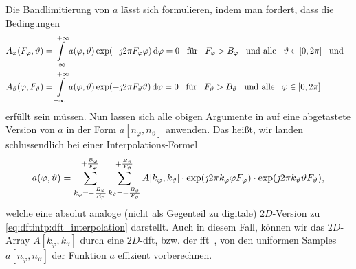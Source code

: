 Die Bandlimitierung von $a$ l\"asst sich formulieren, indem man fordert, dass die Bedingungen
\begin{align}
    A_{\varphi}(F_\varphi, \vartheta) 
    &= {\int\limits_{-\infty}^{+\infty}{
        a(\varphi, \vartheta) \exp(-\jmath 2 \pi F_\varphi \varphi)
    }\,\mathrm{d}{\varphi}} = 0 
    {\hspace{3mm} \text{f\"ur} \hspace{3mm}} F_\varphi > B_\varphi {\hspace{3mm} \text{und alle} \hspace{3mm}} \vartheta \in [0, 2 \pi] {\hspace{3mm} \text{und} \hspace{3mm}} \\
    A_{\vartheta}(\varphi, F_\vartheta) 
    &= {\int\limits_{-\infty}^{+\infty}{
        a(\varphi, \vartheta) \exp(-\jmath 2 \pi F_\vartheta \vartheta)
    }\,\mathrm{d}{\varphi}} = 0 
    {\hspace{3mm} \text{f\"ur} \hspace{3mm}} F_\vartheta > B_\vartheta {\hspace{3mm} \text{und alle} \hspace{3mm}} \varphi \in [0, 2 \pi]
\end{align}
erf\"ullt sein m\"ussen.
Nun lassen sich alle obigen Argumente in   auf eine abgetastete Version von $a$ in der Form $a[n_\varphi, n_\vartheta]$ anwenden. 
Das hei{\ss}t, wir landen schlussendlich bei einer Interpolations-Formel
\begin{equation}\label{2d_dft_interpolation}
    a(\varphi, \vartheta) = {\sum\limits_{k_\varphi=-\frac{B_\varphi}{F_\varphi}}^{+\frac{B_\varphi}{F_\varphi}}{
        {\sum\limits_{k_\vartheta=-\frac{B_\vartheta}{F_\vartheta}}^{+\frac{B_\vartheta}{F_\vartheta}}{
            A[k_\varphi, k_\vartheta] 
            \cdot \exp(\jmath 2 \pi k_\varphi \varphi F_\varphi)
            \cdot \exp(\jmath 2 \pi k_\vartheta \vartheta F_\vartheta)
        }}
    }},
\end{equation}
welche eine absolut analoge (nicht als Gegenteil zu digitale) $2D$-Version zu \eqref{eq:dftintp:dft_interpolation} darstellt.
Auch in diesem Fall, k\"onnen wir das $2D$-Array $A[k_\varphi, k_\vartheta]$ durch eine $2D$-\gls{dft}, bzw. der \gls{fft}~\cite{FFTW05}, von den uniformen Samples $a[n_\varphi, n_\vartheta]$ der Funktion $a$ effizient vorberechnen.

